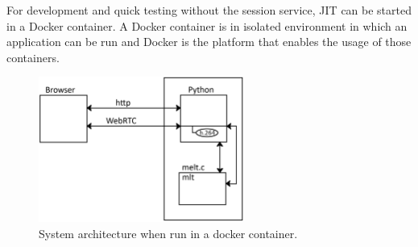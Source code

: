\documentclass[../MasterThesis.tex]{subfiles}
\begin{document}



%
%

For development and quick testing without the session service, JIT can be started in a Docker container. A Docker container is in isolated environment in which an application can be run and Docker is the platform that enables the usage of those containers.~\cite{docker}


\begin{figure}[H]
	\centering
	\includegraphics[width=0.6\textwidth]{IM2.png}
	\caption{System architecture when run in a docker container.}
\end{figure}
\end{document}
